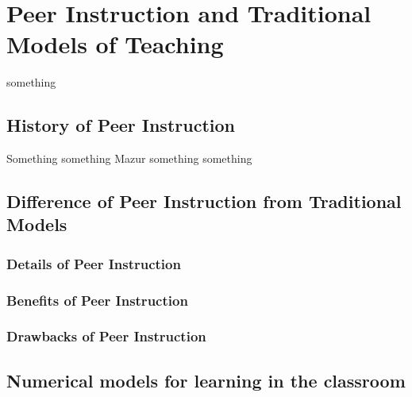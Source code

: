 \chapter{Peer Instruction and Traditional Models of Teaching}

\hspace{\parindent} something
\section{History of Peer Instruction}
\hspace{\parindent} Something something Mazur something something
\newpage
\section{Difference of Peer Instruction from Traditional Models}
\subsection{Details of Peer Instruction}
\subsection{Benefits of Peer Instruction}
\subsection{Drawbacks of Peer Instruction}
\section{Numerical models for learning in the classroom}